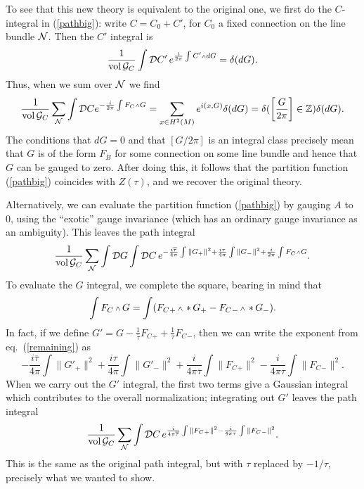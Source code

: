 To see that this new theory is equivalent to the original one, we first
do the $C$-integral in (\ref{pathbig}): write $C=C_0+C'$, for $C_0$ a fixed
connection on the
line bundle ${\cal N}$.  Then the $C'$ integral is
\begin{equation}
\frac1{\vol{\cG_C}}\int \cD C'\,e^{\frac{i}{2\pi}\int C'\wdg dG}=\delta(dG).
\end{equation}
Thus, when
we sum over ${\cal N}$ we find
\begin{equation}
\frac1{\vol{\cG_C}}\sum_{\lbn} \int \cD Ce^{-\frac{i}{2\pi}\int F_C\wdg G}
= \sum_{x\in H^2(M)}
e^{i (x,G)}\delta(dG)=\delta(\left[\frac G{2\pi}\right] \in \IZ)\delta(dG).
\end{equation}
The conditions that $dG=0$ and that $[G/2\pi]$ is an integral class
precisely mean that $G$ is of the form $F_B$ for some connection
on some line bundle and hence that $G$ can be gauged to zero.
After doing this,
it follows that the partition function (\ref{pathbig}) coincides with
$Z(\tau)$, and we recover the original theory.

Alternatively, we can evaluate the  partition function (\ref{pathbig}) by
gauging $A$ to $0$,
using the ``exotic'' gauge invariance (which has an ordinary gauge
invariance as an ambiguity).  This leaves the path integral
\begin{equation}\label{remaining}
\frac1{\vol{\cG_C}} \sum_{\lbn} \int\cD G\int \cD C\,
e^{-\frac{i\overline{\tau}}{4\pi}\int \|G_+\|^2+\frac{i\tau}{4\pi}\int
\|G_-\|^2 +\frac{i}{2\pi}\int F_C\wdg G} .
\end{equation}
To evaluate the $G$ integral, we complete the square,
bearing in mind that
\begin{equation}
\int F_C\wdg G=\int (F_C{}_+\wdg \hstar G_+-F_C{}_-\wdg \hstar G_-).
\end{equation}
In fact, if we define $G'=G - \frac1{\overline\tau} F_C{}_+ +
\frac1\tau F_C{}_-$, then we can write the exponent from
eq.~(\ref{remaining}) as
\begin{equation}
-\frac{i\overline{\tau}}{4\pi}\int \|G'_+\|^2
+\frac{i\tau}{4\pi}\int \|G'_-\|^2
+\frac{i}{4\pi\overline{\tau}}\int\| F_C{}_+\|^2
-\frac{i}{4\pi\tau}\int\| F_C{}_-\|^2 .
\end{equation}
When we carry out the $G'$ integral, the first two terms give a Gaussian
integral which contributes to the overall normalization; integrating out
$G'$ leaves the path integral
\begin{equation}
\frac1{\operatorname{\rm vol}{{\cal G}_C}}\sum_{{\cal N}}\int {\cal D} C \,
e^{\frac{i}{4\pi\overline{\tau}}\int\| F_C{}_+\|^2
-\frac{i}{4\pi\tau}\int\| F_C{}_-\|^2} .
\end{equation}
This is the same as the original path integral, but with $\tau$ replaced by
$-1/\tau$, precisely what we wanted to show.

